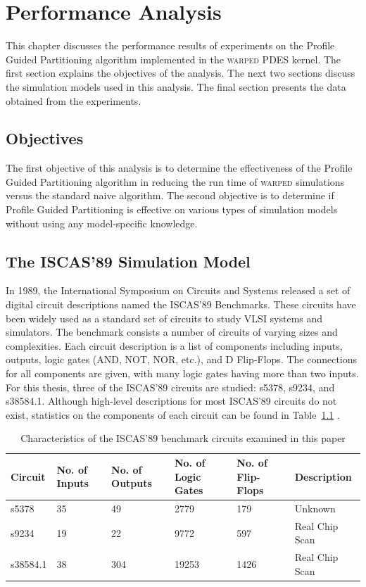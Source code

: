 \documentclass[11pt]{book}
\begin{document}
\chapter{Performance Analysis}\label{analysis}

This chapter discusses the performance results of experiments on the Profile Guided Partitioning algorithm implemented in the \textsc{warped} PDES kernel. The first section explains the objectives of the analysis. The next two sections discuss the simulation models used in this analysis. The final section presents the data obtained from the experiments.

\section{Objectives}

The first objective of this analysis is to determine the effectiveness of the Profile Guided Partitioning algorithm in reducing the run time of \textsc{warped} simulations versus the standard naive algorithm. The second objective is to determine if Profile Guided Partitioning is effective on various types of simulation models without using any model-specific knowledge.

\section{The ISCAS'89 Simulation Model}

In 1989, the International Symposium on Circuits and Systems released a set of digital circuit descriptions named the ISCAS'89 Benchmarks. These circuits have been widely used as a standard set of circuits to study VLSI systems and simulators. The benchmark consists a number of circuits of varying sizes and complexities. Each circuit description is a list of components including inputs, outputs, logic gates (AND, NOT, NOR, etc.), and D Flip-Flops. The connections for all components are given, with many logic gates having more than two inputs. For this thesis, three of the ISCAS'89 circuits are studied: s5378, s9234, and s38584.1. Although high-level descriptions for most ISCAS'89 circuits do not exist, statistics on the components of each circuit can be found in Table~\ref{tab:iscasStats} \cite{brglez-89}.

\begin{table}[h]
\centering
\begin{tabular}{@{}llllll@{}}
\toprule
Circuit  & No. of Inputs & No. of Outputs & No. of Logic Gates & No. of Flip-Flops & Description    \\ \midrule
s5378    & 35            & 49             & 2779               & 179               & Unknown        \\
s9234    & 19            & 22             & 9772               & 597               & Real Chip Scan \\
s38584.1 & 38            & 304            & 19253              & 1426              & Real Chip Scan \\ \bottomrule
\end{tabular}
\caption{Characteristics of the ISCAS'89 benchmark circuits examined in this paper}
\label{tab:iscasStats}
\end{table}
\end{document}
